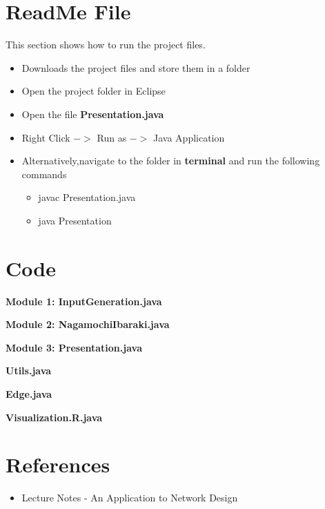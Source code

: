 \documentclass[12pt,letterpaper,titlepage,en-US]{article}
\begin{document}
  \section{ReadMe File}
  This section shows how to run the project files.
  \begin{itemize}
  \item Downloads the project files and store them in a folder
  \item Open the project folder in Eclipse
  \item Open the file \textbf{Presentation.java}
  \item Right Click $->$ Run as $->$ Java Application
  \item Alternatively,navigate to the folder in \textbf{terminal} and run the following commands
  \begin{itemize}
  \item javac Presentation.java
  \item java Presentation
  \end{itemize}
  \end{itemize}

  

 
\section{Code}

\textbf{Module 1: InputGeneration.java}


\pagebreak
\textbf{Module 2: NagamochiIbaraki.java}


\pagebreak
\textbf{Module 3: Presentation.java}


\pagebreak
\textbf{Utils.java}


\textbf{Edge.java}


\textbf{Visualization.R.java}



\section{References}
\begin{itemize}


\item Lecture Notes - An Application to Network Design
\end{itemize}
\end{document}
